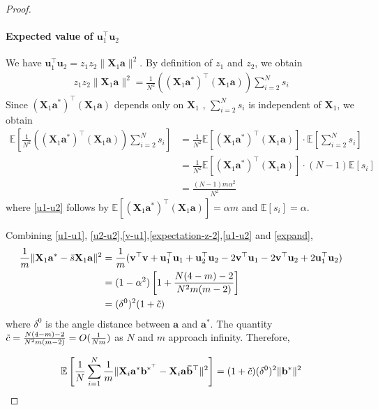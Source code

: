 \documentclass{article}
\theoremstyle{plain}
\theoremstyle{definition}
\theoremstyle{remark}
\begin{document}
\begin{proof}
    
    \paragraph{Expected value of $\mathbf{u}_1^\top \mathbf{u}_2$} We have $\mathbf{u}_1^\top \mathbf{u}_2= z_1 z_2 \| \mathbf{X}_1 \mathbf{a} \|^2$. By definition of $z_1$ and $z_2$, we obtain
    \begin{align}
         z_1 z_2 \| \mathbf{X}_1 \mathbf{a} \|^2 = \frac{1}{N^2}((\mathbf{X}_1 \mathbf{a}^*)^\top (\mathbf{X}_1 \mathbf{a}) ) \sum_{i=2}^N s_i
    \end{align}
    Since $(\mathbf{X}_1 \mathbf{a}^*)^\top (\mathbf{X}_1 \mathbf{a})$ depends only on $\mathbf{X}_1$ , $\sum_{i=2}^N s_i$ is independent of $\mathbf{X}_1$, we obtain
    \begin{align}
        \mathbb{E}\left[ \frac{1}{N^2}((\mathbf{X}_1 \mathbf{a}^*)^\top (\mathbf{X}_1 \mathbf{a}) ) \sum_{i=2}^N s_i \right]
       &  = \frac{1}{N^2} \mathbb{E}\left[ (\mathbf{X}_1 \mathbf{a}^*)^\top (\mathbf{X}_1 \mathbf{a})\right] \cdot \mathbb{E}\left[\sum_{i=2}^N s_i \right] \\
       & = \frac{1}{N^2} \mathbb{E}\left[ (\mathbf{X}_1 \mathbf{a}^*)^\top (\mathbf{X}_1 \mathbf{a})\right] \cdot (N-1) \mathbb{E}\left[ s_i \right] \\
       & = \frac{(N-1)m\alpha^2 }{N^2} \label{u1-u2}
    \end{align}
    where \eqref{u1-u2} follows by $\mathbb{E}\left[ (\mathbf{X}_1 \mathbf{a}^*)^\top (\mathbf{X}_1 \mathbf{a})\right]=\alpha m$ and $\mathbb{E}\left[ s_i \right]=\alpha$.
    
    Combining \eqref{u1-u1}, \eqref{u2-u2},\eqref{v-u1},\eqref{expectation-z-2},\eqref{u1-u2} and \eqref{expand}, 
    \begin{align}
        \frac{1}{m}\lVert \mathbf{X}_1 \mathbf{a}^*- \Bar{s} \mathbf{X}_1 \mathbf{a}\rVert^2 & = \frac{1}{m}(\mathbf{v}^\top \mathbf{v} + \mathbf{u}_1^\top \mathbf{u}_1 + \mathbf{u}_2^\top \mathbf{u}_2 -2 \mathbf{v}^\top \mathbf{u}_1 - 2\mathbf{v}^\top \mathbf{u}_2 + 2 \mathbf{u}_1^\top \mathbf{u}_2) \\
        & = (1-\alpha^2)\left[ 1+ \frac{N(4-m)-2}{N^2m(m-2)}\right] \\
        & = (\delta^0)^2(1+\Tilde{c})
    \end{align}
    where $\delta^0$ is the angle distance between $\mathbf{a}$ and $\mathbf{a}^*$. The quantity $ \Tilde{c}= \frac{N(4-m)-2}{N^2m(m-2)}=O(\frac{1}{Nm})$ as $N$ and $m$ approach infinity. Therefore,

\begin{align}
        \mathbb{E}\left[\frac{1}{N}\sum_{i=1}^{N}\frac{1}{m}\lVert \mathbf{X}_i \mathbf{a}^*\mathbf{b}^{*^{\top}}- \mathbf{X}_i \mathbf{a}\mathbf{\Bar{b}}^{\top}\rVert^2\right] = (1+\Tilde{c})  (\delta^0)^2 \lVert \mathbf{b}^*\rVert^2
    \end{align}

\end{proof}
\end{document}
